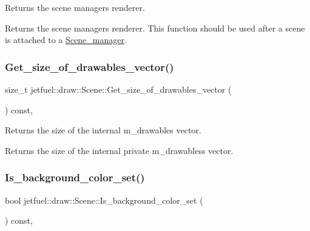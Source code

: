 Returns the scene manager\textquotesingle{}s renderer. 

Returns the scene manager\textquotesingle{}s renderer. This function should be used after a scene is attached to a \hyperlink{classjetfuel_1_1draw_1_1Scene__manager}{Scene\+\_\+manager}. \mbox{\label{classjetfuel_1_1draw_1_1Scene_a62423470cca53acd55ff174d6e37d730}} 
\subsubsection{\texorpdfstring{Get\+\_\+size\+\_\+of\+\_\+drawables\+\_\+vector()}{Get\_size\_of\_drawables\_vector()}}
{\footnotesize\ttfamily size\+\_\+t jetfuel\+::draw\+::\+Scene\+::\+Get\+\_\+size\+\_\+of\+\_\+drawables\+\_\+vector (\begin{DoxyParamCaption}{ }\end{DoxyParamCaption}) const\hspace{0.3cm}{\ttfamily [inline]}, {\ttfamily [protected]}}



Returns the size of the internal m\+\_\+drawables vector. 

Returns the size of the internal private m\+\_\+drawabless vector. \mbox{\label{classjetfuel_1_1draw_1_1Scene_a1d8d53f33a18643e5ee7ea05e9906786}} 
\subsubsection{\texorpdfstring{Is\+\_\+background\+\_\+color\+\_\+set()}{Is\_background\_color\_set()}}
{\footnotesize\ttfamily bool jetfuel\+::draw\+::\+Scene\+::\+Is\+\_\+background\+\_\+color\+\_\+set (\begin{DoxyParamCaption}{ }\end{DoxyParamCaption}) const\hspace{0.3cm}{\ttfamily [inline]}, {\ttfamily [protected]}}



